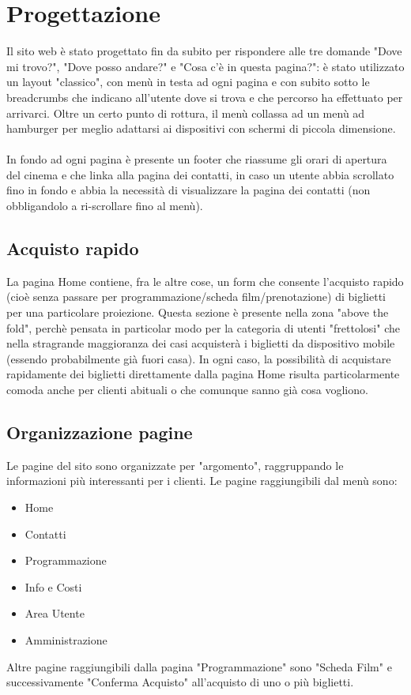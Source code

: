 \documentclass[a4paper, 12pt]{article}
\begin{document}
\section{Progettazione}
Il sito web è stato progettato fin da subito per rispondere alle tre domande "Dove mi trovo?", "Dove posso andare?" e "Cosa c'è in questa pagina?": è stato utilizzato un layout "classico", con menù in testa ad ogni pagina e con subito sotto le breadcrumbs che indicano all'utente dove si trova e che percorso ha effettuato per arrivarci. Oltre un certo punto di rottura, il menù collassa ad un menù ad hamburger per meglio adattarsi ai dispositivi con schermi di piccola dimensione.\\
\\In fondo ad ogni pagina è presente un footer che riassume gli orari di apertura del cinema e che linka alla pagina dei contatti, in caso un utente abbia scrollato fino in fondo e abbia la necessità di visualizzare la pagina dei contatti (non obbligandolo a ri-scrollare fino al menù).
\subsection{Acquisto rapido}
La pagina Home contiene, fra le altre cose, un form che consente l'acquisto rapido (cioè senza passare per programmazione/scheda film/prenotazione) di biglietti per una particolare proiezione. Questa sezione è presente nella zona "above the fold", perchè pensata in particolar modo per la categoria di utenti "frettolosi" che nella stragrande maggioranza dei casi acquisterà i biglietti da dispositivo mobile (essendo probabilmente già fuori casa). In ogni caso, la possibilità di acquistare rapidamente dei biglietti direttamente dalla pagina Home risulta particolarmente comoda anche per clienti abituali o che comunque sanno già cosa vogliono.
\subsection{Organizzazione pagine}
Le pagine del sito sono organizzate per "argomento", raggruppando le informazioni più interessanti per i clienti.
Le pagine raggiungibili dal menù sono:
\begin{itemize}
    \item Home
    \item Contatti
    \item Programmazione
    \item Info e Costi
    \item Area Utente
    \item Amministrazione
\end{itemize}
Altre pagine raggiungibili dalla pagina "Programmazione" sono "Scheda Film" e successivamente "Conferma Acquisto" all'acquisto di uno o più biglietti.
\end{document}
